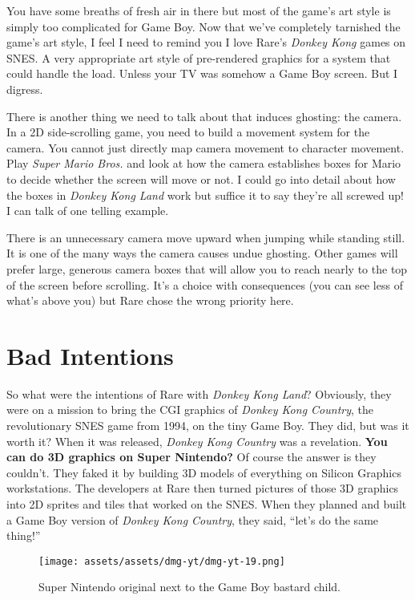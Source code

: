 \documentclass{book}
\begin{document}
You have some breaths of fresh air in there but most of the game’s art style is simply too complicated for Game Boy. Now that we’ve completely tarnished the game’s art style, I feel I need to remind you I love Rare’s \emph{Donkey Kong} games on SNES. A very appropriate art style of pre-rendered graphics for a system that could handle the load. Unless your TV was somehow a Game Boy screen. But I digress.

There is another thing we need to talk about that induces ghosting: the camera. In a 2D side-scrolling game, you need to build a movement system for the camera. You cannot just directly map camera movement to character movement. Play \emph{Super Mario Bros.} and look at how the camera establishes boxes for Mario to decide whether the screen will move or not. I could go into detail about how the boxes in \emph{Donkey Kong Land} work but suffice it to say they’re all screwed up! I can talk of one telling example.



There is an unnecessary camera move upward when jumping while standing still. It is one of the many ways the camera causes undue ghosting. Other games will prefer large, generous camera boxes that will allow you to reach nearly to the top of the screen before scrolling. It’s a choice with consequences (you can see less of what’s above you) but Rare chose the wrong priority here.

\FloatBarrier\needspace{5pt}\section*{Bad Intentions}\nopagebreak[4]

So what were the intentions of Rare with \emph{Donkey Kong Land}? Obviously, they were on a mission to bring the CGI graphics of \emph{Donkey Kong Country}, the revolutionary SNES game from 1994, on the tiny Game Boy. They did, but was it worth it? When it was released, \emph{Donkey Kong Country} was a revelation. \textbf{You can do 3D graphics on Super Nintendo?} Of course the answer is they couldn’t. They faked it by building 3D models of everything on Silicon Graphics workstations. The developers at Rare then turned pictures of those 3D graphics into 2D sprites and tiles that worked on the SNES. When they planned and built a Game Boy version of \emph{Donkey Kong Country}, they said, “let’s do the same thing!”

\begin{figure}[hbt]
\vskip 10pt
\centering \texttt{[image: assets/assets/dmg-yt/dmg-yt-19.png]}\par\pagetwodescription Super Nintendo original next to the Game Boy bastard child.
\vskip 6pt
\end{figure}
\end{document}
